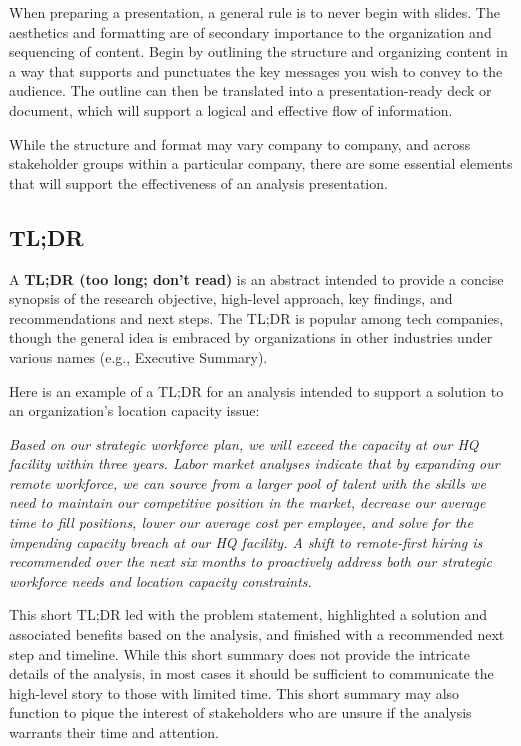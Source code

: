 \documentclass[
]{book}
\begin{document}
When preparing a presentation, a general rule is to never begin with slides. The aesthetics and formatting are of secondary importance to the organization and sequencing of content. Begin by outlining the structure and organizing content in a way that supports and punctuates the key messages you wish to convey to the audience. The outline can then be translated into a presentation-ready deck or document, which will support a logical and effective flow of information.

While the structure and format may vary company to company, and across stakeholder groups within a particular company, there are some essential elements that will support the effectiveness of an analysis presentation.

\hypertarget{tldr}{%
\subsection{TL;DR}\label{tldr}}

A \textbf{TL;DR (too long; don't read)} is an abstract intended to provide a concise synopsis of the research objective, high-level approach, key findings, and recommendations and next steps. The TL;DR is popular among tech companies, though the general idea is embraced by organizations in other industries under various names (e.g., Executive Summary).

Here is an example of a TL;DR for an analysis intended to support a solution to an organization's location capacity issue:

\emph{Based on our strategic workforce plan, we will exceed the capacity at our HQ facility within three years. Labor market analyses indicate that by expanding our remote workforce, we can source from a larger pool of talent with the skills we need to maintain our competitive position in the market, decrease our average time to fill positions, lower our average cost per employee, and solve for the impending capacity breach at our HQ facility. A shift to remote-first hiring is recommended over the next six months to proactively address both our strategic workforce needs and location capacity constraints.}

This short TL;DR led with the problem statement, highlighted a solution and associated benefits based on the analysis, and finished with a recommended next step and timeline. While this short summary does not provide the intricate details of the analysis, in most cases it should be sufficient to communicate the high-level story to those with limited time. This short summary may also function to pique the interest of stakeholders who are unsure if the analysis warrants their time and attention.
\end{document}
